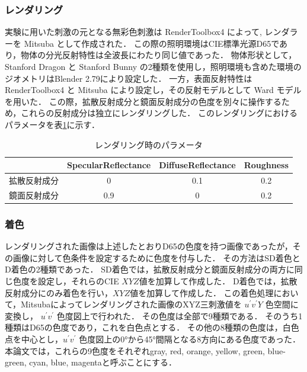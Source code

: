         \subsubsection{レンダリング}

            実験に用いた刺激の元となる無彩色刺激は RenderToolbox4 によって, レンダラーを Mitsuba\cite{Mitsuba} として作成された．
            この際の照明環境はCIE標準光源D65であり，物体の分光反射特性は全波長にわたり同じ値であった．
            物体形状として，Stanford Dragon と Stanford Bunny \cite{StanfordModels} の2種類を使用し，照明環境も含めた環境のジオメトリはBlender 2.79により設定した．
            一方，表面反射特性は RenderToolbox4 と Mitsuba により設定し，その反射モデルとして Ward モデル\cite{Ward}を用いた．
            この際，拡散反射成分と鏡面反射成分の色度を別々に操作するため，これらの反射成分は独立にレンダリングした．
            このレンダリングにおけるパラメータを表\ref{render_param}に示す．

            \begin{table}[h]
                \centering
                \caption{レンダリング時のパラメータ}
                \begin{tabular}{|l||c|c|c|} \hline
                                           & SpecularReflectance & DiffuseReflectance & Roughness \\ \hline \hline
                    拡散反射成分           & 0                   & 0.1                & 0.2 \\ \hline
                    鏡面反射成分           & 0.9                 & 0                  & 0.2 \\ \hline
                \end{tabular}
                \label{render_param}
            \end{table}
        
        \subsubsection{着色}

            レンダリングされた画像は上述したとおりD65の色度を持つ画像であったが，その画像に対して色条件を設定するために色度を付与した．
            その方法はSD着色とD着色の2種類であった．
            SD着色では，拡散反射成分と鏡面反射成分の両方に同じ色度を設定し，それらのCIE $XYZ$値を加算して作成した．
            D着色では，拡散反射成分にのみ着色を行い，$XYZ$値を加算して作成した．
            この着色処理において，Mitsubaによってレンダリングされた画像のXYZ三刺激値を $u^{\prime}v^{\prime}Y$ 色空間に変換し， $u^{\prime}v^{\prime}$ 色度図上で行われた．
            その色度は全部で9種類である．
            そのうち1種類はD65の色度であり，これを白色点とする．
            その他の8種類の色度は，白色点を中心とし，$u^{\prime}v^{\prime}$ 色度図上の0°から45°間隔となる8方向にある色度であった．
            本論文では，これらの9色度をそれぞれgray, red, orange, yellow, green, blue-green, cyan, blue, magentaと呼ぶことにする．

